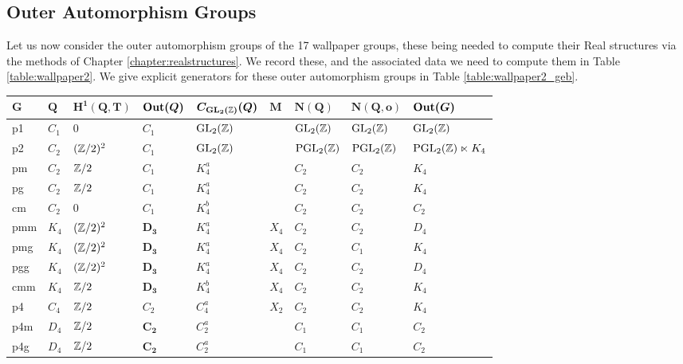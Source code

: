 \subsection{Outer Automorphism Groups} Let us now consider the outer automorphism groups of the 17 wallpaper groups, these being needed to compute their Real structures via the methods of Chapter \ref{chapter:realstructures}. We record these, and the associated data we need to compute them in Table \ref{table:wallpaper2}. We give explicit generators for these outer automorphism groups in Table \ref{table:wallpaper2_geb}.

\begin{table}[!htbp]
\centering
\small
\begin{tabular}{lllllllll}
\toprule
 $\boldsymbol{G}$ &  $\boldsymbol{Q}$ &  $\boldsymbol{H^1(Q,T)}$  & $\boldsymbol{\operatorname{Out}(Q)}$ & $\boldsymbol{C_{\operatorname{GL}_2 ({\mathbb Z}) }(Q)}$ & $\boldsymbol{M}$  & $\boldsymbol{N(Q)}$ & $\boldsymbol{N(Q,o)}$ &  $\boldsymbol{\operatorname{Out}(G)}$  \\
\midrule
p1   & $C_1$       & $0$      &  $C_1$ & $\operatorname{GL}_2 ({\mathbb Z})$  &   & $\operatorname{GL}_2 ({\mathbb Z})$ &  $\operatorname{GL}_2 ({\mathbb Z})$ &  $\operatorname{GL}_2 ({\mathbb Z})$ \\
p2   & $C_2$    & $({\mathbb Z}/2)^2$  & $C_1$  &  $\operatorname{GL}_2 ({\mathbb Z})$  &   &  $\operatorname{PGL}_2 ({\mathbb Z})$ & $\operatorname{PGL}_2 ({\mathbb Z})$ & $\operatorname{PGL}_2 ({\mathbb Z})\ltimes K_4$  \\
\midrule
pm   & $C_2$      &  ${\mathbb Z}/2$ & $C_1$  & $K^a_4$ &   & $C_2$ & $C_2$ &  $K_4$ \\
pg   &  $C_2$      & ${\mathbb Z}/2$  & $C_1$  & $K^a_4$ &   & $C_2$ & $C_2$ &  $K_4$\\
cm   & $C_2$      & $0$  & $C_1$  & $K^b_4$ &   & $C_2$ & $C_2$ &  $C_2$ \\
pmm  & $K_4$   & $({\mathbb Z}/2)^2$  & $\boldsymbol{D_3}$  & $K_4^a$ & $X_4$ & $C_2$ &$C_2$ &  $D_4$\\
pmg  &  $K_4$     & $({\mathbb Z}/2)^2$  & $\boldsymbol{D_3}$  & $K_4^a$ & $X_4$ &   $C_2$ & $C_1$ &  $K_4$\\
pgg  & $K_4$     & $({\mathbb Z}/2)^2$  & $\boldsymbol{D_3}$  & $K_4^a$ & $X_4$ &    $C_2$ & $C_2$ &  $D_4$\\
cmm  &  $K_4$    & ${\mathbb Z}/2$ & $\boldsymbol{D_3}$  &  $K^b_4$ & $X_4$ &    $C_2$ & $C_2$ &  $K_4$\\
\midrule
p4   & $C_4$     & ${\mathbb Z}/2$       & $C_2$ & $C^a_4$  & $X_2$ &  $C_2$  &  $C_2$ &  $K_4$\\
p4m  & $D_4$    &  ${\mathbb Z}/2$       & $\boldsymbol{C_2}$ & $C^a_2$ &   &  $C_1$ &  $C_1$ &  $C_2$   \\
p4g  & $D_4$     & ${\mathbb Z}/2$      & $\boldsymbol{C_2}$ & $C^a_2$  &   &  $C_1$ &  $C_1$ &  $C_2$   \\

\end{tabular}
\end{table}
